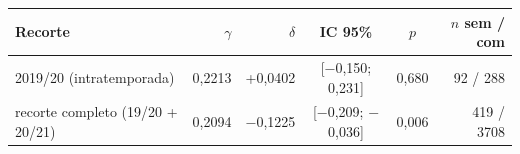 \begin{tabular}{lrrccr}
  \toprule
  Recorte & $\gamma$ & $\delta$ & IC 95\% & $p$ & $n$ sem / com \\
  \midrule
  2019/20 (intratemporada) & 0,2213 & +0,0402 & [$-$0,150; 0,231] & 0,680 & 92 / 288 \\
  recorte completo (19/20 + 20/21) & 0,2094 & $-$0,1225 & [$-$0,209; $-$0,036] & 0,006 & 419 / 3708 \\
  \bottomrule
\end{tabular}
